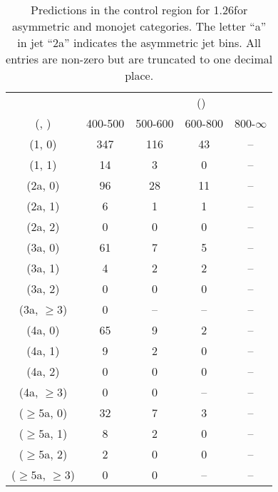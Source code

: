 \begin{table}[h!]
\tiny
\centering
\caption{Predictions in the \gj control region for 1.26\ifb for asymmetric and monojet categories. The letter ``a'' in jet \eg ``2a''  indicates the asymmetric jet bins. All entries are non-zero but are truncated to one decimal place.\label{tab:predsep_data_gj_asym}}
\begin{tabular}
{ccccc}
	\hline\hline
&	& \multicolumn{4}{c}{\scalht (\gev)} \\ 
	 (\njet,  \nb) & 400-500 & 500-600 & 600-800 & 800-$\infty$ \\ [0.8ex] 
\hline
	(1, 0) & 347 & 116 & 43 & -- \\[0.5ex] 
	(1, 1) & 14 & 3 & 0 & -- \\[0.5ex] 
	(2a, 0) & 96 & 28 & 11 & -- \\[0.5ex] 
	(2a, 1) & 6 & 1 & 1 & -- \\[0.5ex] 
	(2a, 2) & 0 & 0 & 0 & -- \\[0.5ex] 
	(3a, 0) & 61 & 7 & 5 & -- \\[0.5ex] 
	(3a, 1) & 4 & 2 & 2 & -- \\[0.5ex] 
	(3a, 2) & 0 & 0 & 0 & -- \\[0.5ex] 
	(3a, $\ge3$) & 0 & -- & -- & -- \\[0.5ex] 
	(4a, 0) & 65 & 9 & 2 & -- \\[0.5ex] 
	(4a, 1) & 9 & 2 & 0 & -- \\[0.5ex] 
	(4a, 2) & 0 & 0 & 0 & -- \\[0.5ex] 
	(4a, $\ge3$) & 0 & 0 & -- & -- \\[0.5ex] 
	($\ge5$a, 0) & 32 & 7 & 3 & -- \\[0.5ex] 
	($\ge5$a, 1) & 8 & 2 & 0 & -- \\[0.5ex] 
	($\ge5$a, 2) & 2 & 0 & 0 & -- \\[0.5ex] 
	($\ge5$a, $\ge3$) & 0 & 0 & -- & -- \\[0.5ex] 
	\hline
	\hline
\end{tabular}
\end{table}
